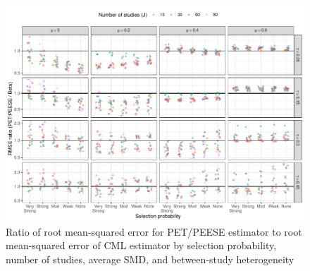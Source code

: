 \documentclass[
]{article}
\begin{document}
\begin{figure}
\includegraphics{appendix-simulation-results_files/figure-latex/rmse-PET-Beta-main-1} \caption{Ratio of root mean-squared error for PET/PEESE estimator to root mean-squared error of CML estimator by selection probability, number of studies, average SMD, and between-study heterogeneity}\label{fig:rmse-PET-Beta-main}
\end{figure}
\end{document}
